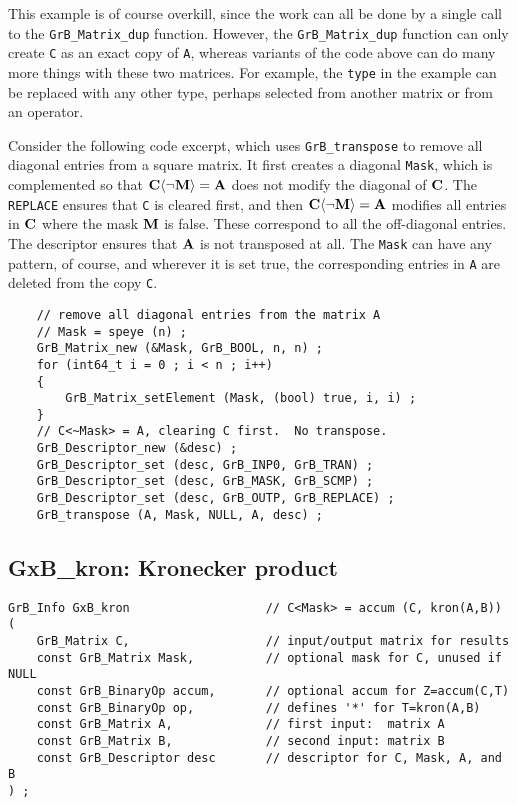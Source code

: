 \documentclass[12pt]{article}
\begin{document}
This example is of course overkill, since the work can all be done by a
single call to the \verb'GrB_Matrix_dup' function.  However, the
\verb'GrB_Matrix_dup' function can only create \verb'C' as an exact copy of
\verb'A', whereas variants of the code above can do many more things with these
two matrices.  For example, the \verb'type' in the example can be replaced with
any other type, perhaps selected from another matrix or from an operator.

Consider the following code excerpt, which uses \verb'GrB_transpose' to remove
all diagonal entries from a square matrix.  It first creates a diagonal
\verb'Mask', which is complemented so that ${\bf C \langle \neg M \rangle =A}$
does not modify the diagonal of ${\bf C}$.  The \verb'REPLACE' ensures that
\verb'C' is cleared first, and then ${\bf C \langle \neg M \rangle = A}$
modifies all entries in ${\bf C}$ where the mask ${\bf M}$ is false.  These
correspond to all the off-diagonal entries.  The descriptor ensures that ${\bf
A}$ is not transposed at all.  The \verb'Mask' can have any pattern, of course,
and wherever it is set true, the corresponding entries in \verb'A' are
deleted from the copy \verb'C'.

    {\footnotesize
    \begin{verbatim}
    // remove all diagonal entries from the matrix A
    // Mask = speye (n) ;
    GrB_Matrix_new (&Mask, GrB_BOOL, n, n) ;
    for (int64_t i = 0 ; i < n ; i++)
    {
        GrB_Matrix_setElement (Mask, (bool) true, i, i) ;
    }
    // C<~Mask> = A, clearing C first.  No transpose.
    GrB_Descriptor_new (&desc) ;
    GrB_Descriptor_set (desc, GrB_INP0, GrB_TRAN) ;
    GrB_Descriptor_set (desc, GrB_MASK, GrB_SCMP) ;
    GrB_Descriptor_set (desc, GrB_OUTP, GrB_REPLACE) ;
    GrB_transpose (A, Mask, NULL, A, desc) ; \end{verbatim}}

\newpage
\subsection{{\sf GxB\_kron:} Kronecker product} %
\label{kron}

\begin{mdframed}[userdefinedwidth=6in]
{\footnotesize
\begin{verbatim}
GrB_Info GxB_kron                   // C<Mask> = accum (C, kron(A,B))
(
    GrB_Matrix C,                   // input/output matrix for results
    const GrB_Matrix Mask,          // optional mask for C, unused if NULL
    const GrB_BinaryOp accum,       // optional accum for Z=accum(C,T)
    const GrB_BinaryOp op,          // defines '*' for T=kron(A,B)
    const GrB_Matrix A,             // first input:  matrix A
    const GrB_Matrix B,             // second input: matrix B
    const GrB_Descriptor desc       // descriptor for C, Mask, A, and B
) ;
\end{verbatim} } \end{mdframed}
\end{document}
